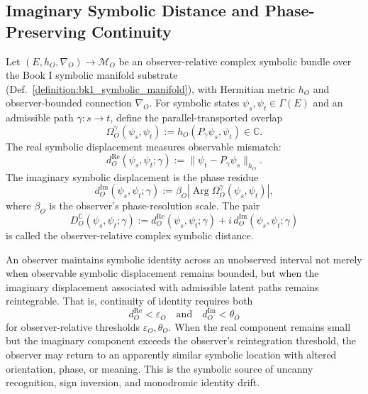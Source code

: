 \subsection{Imaginary Symbolic Distance and Phase-Preserving Continuity}
\label{subsec:bk4_imaginary_symbolic_distance}

\begin{definition}
\label{definition:bk4_imaginary_symbolic_distance}
Let $(E,h_O,\nabla_O) \to \mathcal{M}_O$ be an observer-relative complex symbolic bundle over the Book I symbolic manifold substrate (Def.~\ref{definition:bk1_symbolic_manifold}), with Hermitian metric $h_O$ and observer-bounded connection $\nabla_O$. For symbolic states $\psi_s,\psi_t \in \Gamma(E)$ and an admissible path $\gamma:s\to t$, define the parallel-transported overlap
\[
    \Omega_O^\gamma(\psi_s,\psi_t)
    :=
    h_O\!\left(P_\gamma \psi_s,\psi_t\right)
    \in \mathbb{C}.
\]
The real symbolic displacement measures observable mismatch:
\[
    d_O^{\mathrm{Re}}(\psi_s,\psi_t;\gamma)
    :=
    \| \psi_t - P_\gamma\psi_s \|_{h_O}.
\]
The imaginary symbolic displacement is the phase residue
\[
    d_O^{\mathrm{Im}}(\psi_s,\psi_t;\gamma)
    :=
    \beta_O \left|\operatorname{Arg}\Omega_O^\gamma(\psi_s,\psi_t)\right|,
\]
where $\beta_O$ is the observer's phase-resolution scale. The pair
\[
    D_O^{\mathbb{C}}(\psi_s,\psi_t;\gamma)
    :=
    d_O^{\mathrm{Re}}(\psi_s,\psi_t;\gamma)
    +
    i\,d_O^{\mathrm{Im}}(\psi_s,\psi_t;\gamma)
\]
is called the observer-relative complex symbolic distance.
\end{definition}

\begin{proposition}
\label{proposition:bk4_imaginative_continuity_principle}
An observer maintains symbolic identity across an unobserved interval not merely when observable symbolic displacement remains bounded, but when the imaginary displacement associated with admissible latent paths remains reintegrable. That is, continuity of identity requires both
\[
    d_O^{\mathrm{Re}} < \varepsilon_O
    \quad\text{and}\quad
    d_O^{\mathrm{Im}} < \theta_O
\]
for observer-relative thresholds $\varepsilon_O,\theta_O$. When the real component remains small but the imaginary component exceeds the observer's reintegration threshold, the observer may return to an apparently similar symbolic location with altered orientation, phase, or meaning. This is the symbolic source of uncanny recognition, sign inversion, and monodromic identity drift.
\end{proposition}

